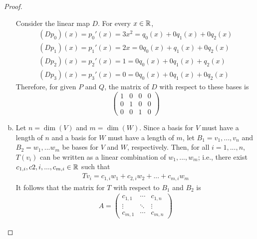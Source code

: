 \begin{proof}
\begin{enumerate}[(a)]
    Consider the linear map $D$. For every $x\in\mathbb R$, 
    \[
        \begin{aligned}
            (Dp_0)(x)=p_0'(x)=3x^2=q_0(x)+0q_1(x)+0q_2(x)\\
            (Dp_1)(x)=p_1'(x)=2x=0q_0(x)+q_1(x)+0q_2(x)\\
            (Dp_2)(x)=p_2'(x)=1=0q_0(x)+0q_1(x)+q_2(x)\\
            (Dp_3)(x)=p_3'(x)=0=0q_0(x)+0q_1(x)+0q_2(x)
        \end{aligned}
    \]
    Therefore, for given $P$ and $Q$, the matrix of $D$ with respect to these bases is 
    \[
        \begin{pmatrix}
            1 & 0 & 0 & 0\\
            0 & 1 & 0 & 0\\
            0 & 0 & 1 & 0
        \end{pmatrix}    
    \]
    \item Let $n=\dim(V)$ and $m=\dim(W)$. Since a basis for $V$ must have a length of $n$ and a basis for $W$ must have a length of $m$, let $B_1=v_1,...,v_n$ and $B_2=w_1,...w_m$ be bases for $V$ and $W$, respectively.
    Then, for all $i=1,...,n$, $T(v_i)$ can be written as a linear combination of $w_1,...,w_m$; i.e., there exist $c_{1,i},c{2,i},...,c_{m,i}\in\mathbb R$ such that 
    \[
        \begin{aligned}
            Tv_i=c_{1,i}w_1+c_{2,i}w_2+...+c_{m,i}w_m
        \end{aligned}
    \]
    It follows that the matrix for $T$ with respect to $B_1$ and $B_2$ is 
    \[
        \begin{aligned}
            A=\begin{pmatrix}
                c_{1,1} & \cdots & c_{1,n}\\
                \vdots & \ddots & \vdots\\
                c_{m,1} & \cdots & c_{m,n}
            \end{pmatrix}
        \end{aligned}
    \]
    
    \end{enumerate}
\end{proof}